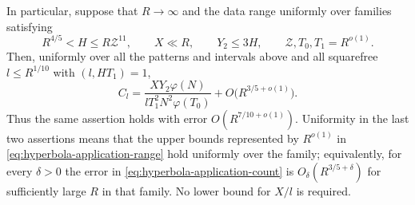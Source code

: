 \begin{lemma}
In particular, suppose that $R\to\infty$ and the data range uniformly
over families satisfying
\begin{equation}
\label{eq:hyperbola-application-range}
 R^{4/5}<H\le R\mathcal Z^{11},\qquad
 X\ll R,\qquad Y_2\le3H,\qquad
 \mathcal Z,T_0,T_1=R^{o(1)}.
\end{equation}
Then, uniformly over all the patterns and intervals above and all
squarefree $l\le R^{1/10}$ with $(l,HT_1)=1$,
\begin{equation}
\label{eq:hyperbola-application-count}
 C_l=
 \frac{XY_2\varphi(N)}{lT_1^2N^2\varphi(T_0)}
 +O\bigl(R^{3/5+o(1)}\bigr).
\end{equation}
Thus the same assertion holds with error $O(R^{7/10+o(1)})$.
Uniformity in the last two assertions means that the upper bounds
represented by $R^{o(1)}$ in
\eqref{eq:hyperbola-application-range} hold uniformly over the family;
equivalently, for every $\delta>0$ the error in
\eqref{eq:hyperbola-application-count} is $O_\delta(R^{3/5+\delta})$
for sufficiently large $R$ in that family.  No lower bound for $X/l$
is required.
\end{lemma}

